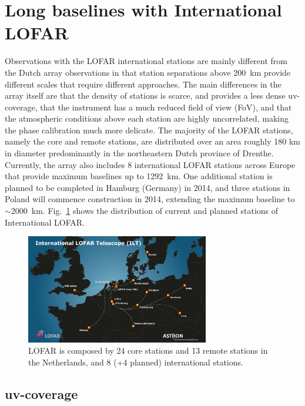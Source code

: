 \documentclass[graybox]{svmult}
\begin{document}
\section{Long baselines with International LOFAR}

Observations with the LOFAR international stations are mainly different from
the Dutch array observations in that station separations above 200~km provide
different scales that require different approaches. The main differences in the
array itself are that the density of stations is scarce, and provides a less
dense uv-coverage, that the instrument has a much reduced field of view (FoV),
and that the atmospheric conditions above each station are highly uncorrelated,
making the phase calibration much more delicate. The majority of the LOFAR
stations, namely the core and remote stations, are distributed over an area
roughly 180 km in diameter predominantly in the northeastern Dutch province of
Drenthe. Currently, the array also includes 8 international LOFAR stations
across Europe that provide maximum baselines up to 1292~km. One additional
station is planned to be completed in Hamburg (Germany) in 2014, and three
stations in Poland will commence construction in 2014, extending the maximum
baseline to $\sim$2000~km. Fig.~\ref{fig:stations} shows the distribution of
current and planned stations of International LOFAR.


\begin{figure}[t]
\begin{center}
\includegraphics[width=8cm]{figures/LOFAR_stations_map.jpg}
\caption{LOFAR is composed by 24 core stations and 13 remote stations in the
Netherlands, and 8 (+4 planned) international stations.}
\label{fig:stations}
\end{center}
\end{figure}

\subsection{uv-coverage}\label{sec:uvcoverage}
\end{document}
